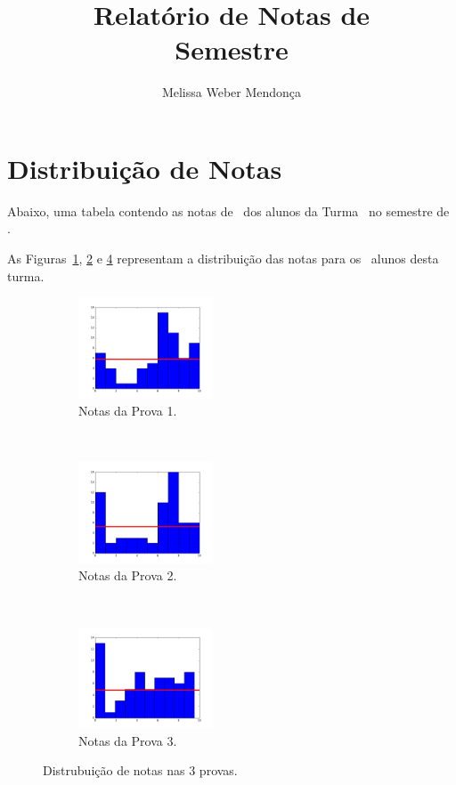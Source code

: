 \documentclass{article}
\title{Relatório de Notas de \disciplina\\Semestre \semestre}
\author{Melissa Weber Mendonça}
\date{}
\begin{document}
\maketitle
\section*{Distribuição de Notas}

Abaixo, uma tabela contendo as notas de \disciplina\ dos alunos da Turma \turma\ no semestre de \semestre.

\begin{table}[!h]
\end{table}

As Figuras~\ref{fig:prova1}, \ref{fig:prova2} e \ref{fig:prova3} representam a distribuição das notas para os \numerodealunos\ alunos desta turma.

\begin{figure}[ht]
   \centering
   \begin{subfigure}[b]{0.3\textwidth}
      \includegraphics[width=4cm]{prova1.png}
      \caption{Notas da Prova 1.}
      \label{fig:prova1}
   \end{subfigure}
   ~
   \begin{subfigure}[b]{0.3\textwidth}
      \includegraphics[width=4cm]{prova2.png}
      \caption{Notas da Prova 2.}
      \label{fig:prova2}
   \end{subfigure}
   ~
   \begin{subfigure}[b]{0.3\textwidth}
      \includegraphics[width=4cm]{prova3.png}
      \caption{Notas da Prova 3.}
      \label{fig:prova3}
   \end{subfigure}
   \caption{Distrubuição de notas nas 3 provas.}
\end{figure}
\end{document}
